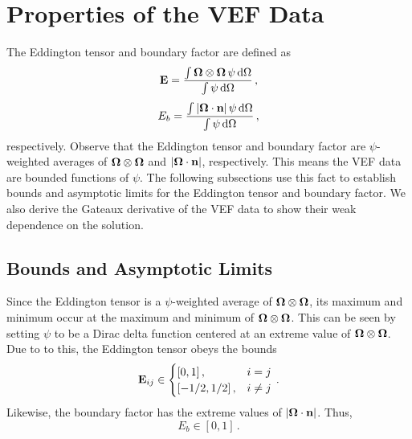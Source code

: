 \documentclass[../doc.tex]{subfiles}
\begin{document}
\section{Properties of the VEF Data}
The Eddington tensor and boundary factor are defined as 
	\begin{equation}
		\boldsymbol{\mathrm{E}} = \frac{\int\boldsymbol{\Omega}\otimes\boldsymbol{\Omega}\,\psi \mathop{}\!\mathrm{d} \Omega}{\int \psi \mathop{}\!\mathrm{d} \Omega}\,,
	\end{equation}
	\begin{equation}
		E_b = \frac{\int|\boldsymbol{\Omega}\cdot\boldsymbol{\mathrm{n}}|\,\psi \mathop{}\!\mathrm{d} \Omega}{\int \psi \mathop{}\!\mathrm{d} \Omega} \,,
	\end{equation}
respectively. Observe that the Eddington tensor and boundary factor are $\psi$-weighted averages of $\boldsymbol{\Omega}\otimes\boldsymbol{\Omega}$ and $|\boldsymbol{\Omega}\cdot\boldsymbol{\mathrm{n}}|$, respectively. This means the VEF data are bounded functions of $\psi$. 
The following subsections use this fact to establish bounds and asymptotic limits for the Eddington tensor and boundary factor. We also derive the Gateaux derivative of the VEF data to show their weak dependence on the solution. 

\subsection{Bounds and Asymptotic Limits}
Since the Eddington tensor is a $\psi$-weighted average of $\boldsymbol{\Omega}\otimes\boldsymbol{\Omega}$, its maximum and minimum occur at the maximum and minimum of $\boldsymbol{\Omega}\otimes\boldsymbol{\Omega}$. This can be seen by setting $\psi$ to be a Dirac delta function centered at an extreme value of $\boldsymbol{\Omega}\otimes\boldsymbol{\Omega}$. Due to to this, the Eddington tensor obeys the bounds 
	\begin{equation}
		\boldsymbol{\mathrm{E}}_{ij} \in \begin{cases}
			[0,1] \,, & i=j \\ 
			[-1/2,1/2] \,, & i\neq j
		\end{cases} \,. 
	\end{equation}
Likewise, the boundary factor has the extreme values of $|\boldsymbol{\Omega}\cdot\boldsymbol{\mathrm{n}}|$. Thus, 
	\begin{equation}
		E_b \in [0,1] \,. 
	\end{equation}
\end{document}
